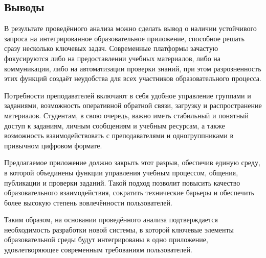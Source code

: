 \subsection{Выводы}

В результате проведённого анализа можно сделать вывод о наличии устойчивого запроса на интегрированное образовательное приложение, способное решать сразу несколько ключевых задач. Современные платформы зачастую фокусируются либо на предоставлении учебных материалов, либо на коммуникации, либо на автоматизации проверки знаний, при этом разрозненность этих функций создаёт неудобства для всех участников образовательного процесса.

Потребности преподавателей включают в себя удобное управление группами и заданиями, возможность оперативной обратной связи, загрузку и распространение материалов. Студентам, в свою очередь, важно иметь стабильный и понятный доступ к заданиям, личным сообщениям и учебным ресурсам, а также возможность взаимодействовать с преподавателями и одногруппниками в привычном цифровом формате.

Предлагаемое приложение должно закрыть этот разрыв, обеспечив единую среду, в которой объединены функции управления учебным процессом, общения, публикации и проверки заданий. Такой подход позволит повысить качество образовательного взаимодействия, сократить технические барьеры и обеспечить более высокую степень вовлечённости пользователей.

Таким образом, на основании проведённого анализа подтверждается необходимость разработки новой системы, в которой ключевые элементы образовательной среды будут интегрированы в одно приложение, удовлетворяющее современным требованиям пользователей.
